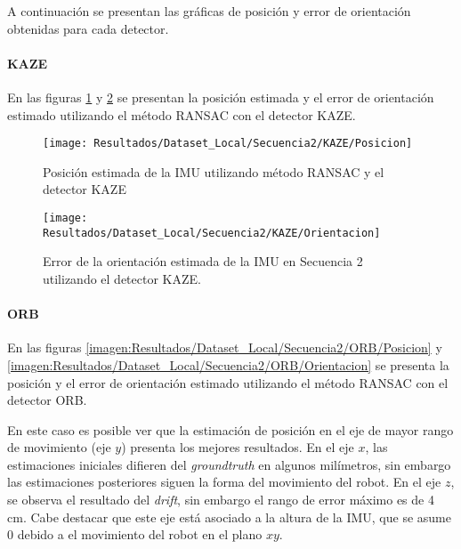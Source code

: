 A continuación se presentan las gráficas de posición y error de orientación obtenidas para cada detector.

\paragraph{KAZE}

En las figuras \ref{imagen:Resultados/Dataset_Local/Secuencia2/KAZE/Posicion} y \ref{imagen:Resultados/Dataset_Local/Secuencia2/KAZE/Orientacion} se presentan la posición estimada y el error de orientación estimado utilizando el método RANSAC con el detector KAZE.

\begin{figure}[H]
	\centering
	\texttt{[image: Resultados/Dataset\_Local/Secuencia2/KAZE/Posicion]}
	\caption{Posición estimada de la IMU utilizando método RANSAC y el detector KAZE}
	\label{imagen:Resultados/Dataset_Local/Secuencia2/KAZE/Posicion}
\end{figure}


\begin{figure}[H]
	\centering
	\texttt{[image: Resultados/Dataset\_Local/Secuencia2/KAZE/Orientacion]}
	\caption[Error de la orientación estimada  de la IMU en Secuencia 2 utilizando el método RANSAC y el detector KAZE]{Error de la orientación estimada  de la IMU en Secuencia 2 utilizando el detector KAZE.}
	\label{imagen:Resultados/Dataset_Local/Secuencia2/KAZE/Orientacion}
\end{figure}


\paragraph{ORB}
En las figuras \ref{imagen:Resultados/Dataset_Local/Secuencia2/ORB/Posicion} y \ref{imagen:Resultados/Dataset_Local/Secuencia2/ORB/Orientacion} se presenta la posición y el error de orientación estimado utilizando el método RANSAC con el detector ORB. 

En este caso es posible ver que la estimación de posición en el eje de mayor rango de movimiento (eje $y$) presenta los mejores resultados. En el eje $x$, las estimaciones iniciales  difieren del \textit{groundtruth} en algunos milímetros, sin embargo las estimaciones posteriores siguen la forma del movimiento del robot. En el eje $z$, se observa el resultado del \textit{drift}, sin embargo el rango de error máximo es de 4 cm. Cabe destacar que este eje está asociado a la altura de la IMU, que se asume 0 debido a el movimiento del robot en el plano $xy$.

